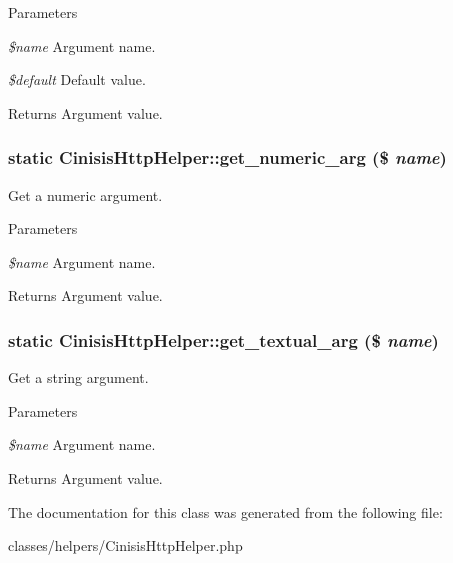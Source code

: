 \begin{DoxyParams}{Parameters}
\item[{\em \$name}]Argument name.\item[{\em \$default}]Default value.\end{DoxyParams}
\begin{DoxyReturn}{Returns}
Argument value. 
\end{DoxyReturn}
\hypertarget{classCinisisHttpHelper_ac61168ccb1eb83a15bb82b012759d67e}{
\subsubsection[{get\_\-numeric\_\-arg}]{\setlength{\rightskip}{0pt plus 5cm}static CinisisHttpHelper::get\_\-numeric\_\-arg (\$ {\em name})}}
\label{classCinisisHttpHelper_ac61168ccb1eb83a15bb82b012759d67e}
Get a numeric argument.


\begin{DoxyParams}{Parameters}
\item[{\em \$name}]Argument name.\end{DoxyParams}
\begin{DoxyReturn}{Returns}
Argument value. 
\end{DoxyReturn}
\hypertarget{classCinisisHttpHelper_aa4c258abb234e9585d2215dfa44247ee}{
\subsubsection[{get\_\-textual\_\-arg}]{\setlength{\rightskip}{0pt plus 5cm}static CinisisHttpHelper::get\_\-textual\_\-arg (\$ {\em name})}}
\label{classCinisisHttpHelper_aa4c258abb234e9585d2215dfa44247ee}
Get a string argument.


\begin{DoxyParams}{Parameters}
\item[{\em \$name}]Argument name.\end{DoxyParams}
\begin{DoxyReturn}{Returns}
Argument value. 
\end{DoxyReturn}


The documentation for this class was generated from the following file:\begin{DoxyCompactItemize}
\item 
classes/helpers/CinisisHttpHelper.php\end{DoxyCompactItemize}
